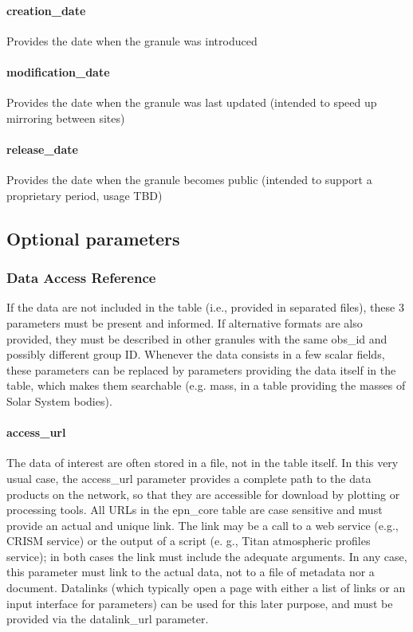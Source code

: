 \documentclass[11pt,a4paper]{ivoa}
\begin{document}
\paragraph{creation\_date}

Provides the date when the granule was introduced

\paragraph{modification\_date}

Provides the date when the granule was last updated (intended to speed up mirroring between sites)

\paragraph{release\_date}

Provides the date when the granule becomes public (intended to support a proprietary period, usage TBD)


\subsection{Optional parameters}

\subsubsection{Data Access Reference}

If the data are not included in the table (i.e., provided in separated files), these 3 parameters must be present and informed. If alternative formats are also provided, they must be described in other granules with the same obs\_id and possibly different group ID. Whenever the data consists in a few scalar fields, these parameters can be replaced by parameters providing the data itself in the table, which makes them searchable (e.g. mass, in a table providing the masses of Solar System bodies).

\paragraph{access\_url}

The data of interest are often stored in a file, not in the table itself. In this very usual case, the access\_url parameter provides a complete path to the data products on the network, so that they are accessible for download by plotting or processing tools. All URLs in the epn\_core table are case sensitive and must provide an actual and unique link. The link may be a call to a web service (e.g., CRISM service) or the output of a script (e. g., Titan atmospheric profiles service); in both cases the link must include the adequate arguments. In any case, this parameter must link to the actual data, not to a file of metadata nor a document. Datalinks (which typically open a page with either a list of links or an input interface for parameters) can be used for this later purpose, and must be provided via the datalink\_url parameter. 
\end{document}
